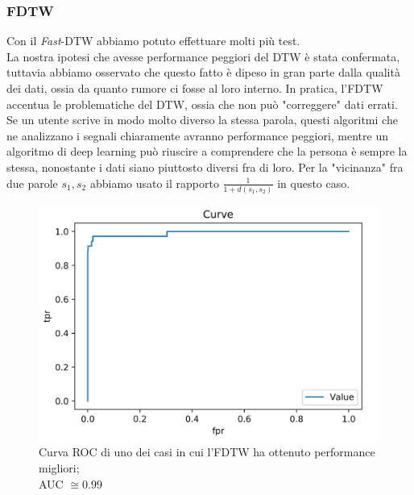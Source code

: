 \documentclass[8pt,notitlepage]{report}
\begin{document}
		\newpage		
		
		\subsubsection{FDTW}
			Con il \textit{Fast}-DTW  abbiamo potuto effettuare molti più test. \\ 
			La nostra ipotesi che avesse performance peggiori del DTW è stata confermata, tuttavia abbiamo osservato che questo fatto è dipeso in gran parte dalla qualità dei dati, ossia da quanto rumore ci fosse al loro interno. In pratica, l'FDTW accentua le problematiche del DTW, ossia che non può "correggere" dati errati. Se un utente scrive in modo molto diverso la stessa parola, questi algoritmi che ne analizzano i segnali chiaramente avranno performance peggiori, mentre un algoritmo di deep learning può riuscire a comprendere che la persona è sempre la stessa, nonostante i dati siano piuttosto diversi fra di loro. Per la "vicinanza" fra due parole $ s_1, s_2 $ abbiamo usato il rapporto $ \frac{1}{1 + d(s_1, s_2)} $ in questo caso.
			
			\begin{figure}[H]
				\begin{center}
					\includegraphics[scale=.35]{ROC_FDTW_Giovanni}
					\caption{Curva ROC di uno dei casi in cui l'FDTW ha ottenuto performance migliori;\\ AUC $ \cong 0.99 $}
				\end{center}
			\end{figure}
			
\end{document}
